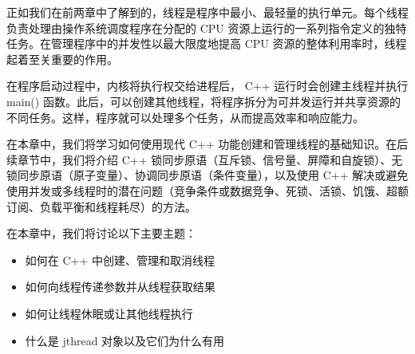 正如我们在前两章中了解到的，线程是程序中最小、最轻量的执行单元。每个线程负责处理由操作系统调度程序在分配的 CPU 资源上运行的一系列指令定义的独特任务。在管理程序中的并发性以最大限度地提高 CPU 资源的整体利用率时，线程起着至关重要的作用。

在程序启动过程中，内核将执行权交给进程后， C++ 运行时会创建主线程并执行 main() 函数。此后，可以创建其他线程，将程序拆分为可并发运行并共享资源的不同任务。这样，程序就可以处理多个任务，从而提高效率和响应能力。

在本章中，我们将学习如何使用现代 C++ 功能创建和管理线程的基础知识。在后续章节中，我们将介绍 C++ 锁同步原语（互斥锁、信号量、屏障和自旋锁）、无锁同步原语（原子变量）、协调同步原语（条件变量），以及使用 C++ 解决或避免使用并发或多线程时的潜在问题（竞争条件或数据竞争、死锁、活锁、饥饿、超额订阅、负载平衡和线程耗尽）的方法。

在本章中，我们将讨论以下主要主题：

\begin{itemize}
\item
如何在 C++ 中创建、管理和取消线程

\item
如何向线程传递参数并从线程获取结果

\item
如何让线程休眠或让其他线程执行

\item
什么是 jthread 对象以及它们为什么有用
\end{itemize}





